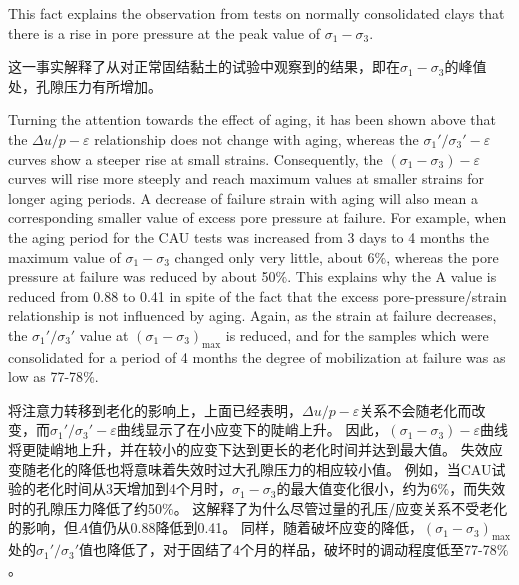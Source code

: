 \begin{paracol}{2}

    This fact explains the observation from tests on normally consolidated clays that there is a rise in pore pressure at the peak value of $\sigma_1-\sigma_3$.

    \switchcolumn

    这一事实解释了从对正常固结黏土的试验中观察到的结果，即在$\sigma_1-\sigma_3$的峰值处，孔隙压力有所增加。

    \switchcolumn*

    Turning the attention towards the effect of aging, it has been shown above that the $\Delta{u}/p-\varepsilon$ relationship does not change with aging, whereas the $\sigma_1'/\sigma_3'-\varepsilon$ curves show a steeper rise at small strains. Consequently, the $(\sigma_1-\sigma_3)-\varepsilon$ curves will rise more steeply and reach maximum values at smaller strains for longer aging periods. A decrease of failure strain with aging will also mean a corresponding smaller value of excess pore pressure at failure. For example, when the aging period for the CAU tests was increased from 3 days to 4 months the maximum value of $\sigma_1-\sigma_3$ changed only very little, about 6$\%$, whereas the pore pressure at failure was reduced by about 50$\%$. This explains why the A value is reduced from 0.88 to 0.41 in spite of the fact that the excess pore-pressure/strain relationship is not influenced by aging. Again, as the strain at failure decreases, the $\sigma_1'/\sigma_3'$ value at $(\sigma_1-\sigma_3)_{\max}$ is reduced, and for the samples which were consolidated for a period of 4 months the degree of mobilization at failure was as low as 77-78$\%$.

    \switchcolumn

    将注意力转移到老化的影响上，上面已经表明，$\Delta{u}/p-\varepsilon$关系不会随老化而改变，而$\sigma_1'/\sigma_3'-\varepsilon$曲线显示了在小应变下的陡峭上升。 因此，$(\sigma_1-\sigma_3)-\varepsilon$曲线将更陡峭地上升，并在较小的应变下达到更长的老化时间并达到最大值。 失效应变随老化的降低也将意味着失效时过大孔隙压力的相应较小值。 例如，当CAU试验的老化时间从3天增加到4个月时，$\sigma_1-\sigma_3$的最大值变化很小，约为6$\%$，而失效时的孔隙压力降低了约50$\%$。 这解释了为什么尽管过量的孔压/应变关系不受老化的影响，但$A$值仍从0.88降低到0.41。 同样，随着破坏应变的降低，$(\sigma_1-\sigma_3)_{\max}$处的$\sigma_1'/\sigma_3'$值也降低了，对于固结了4个月的样品，破坏时的调动程度低至77-78$\%$  。

\end{paracol}